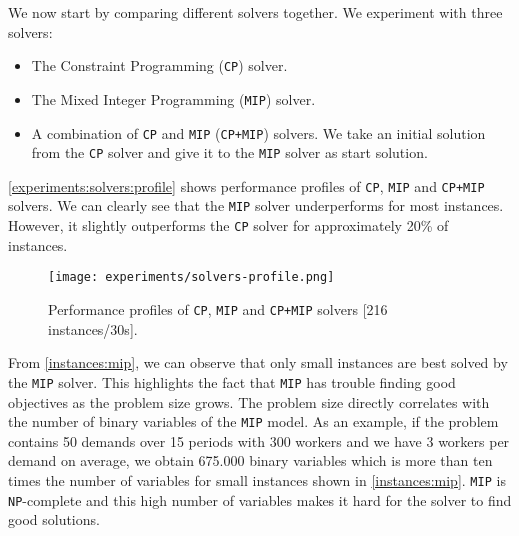 \documentclass[../../thesis.tex]{subfiles}
\begin{document}
We now start by comparing different solvers together. We experiment with three solvers: 

\begin{itemize}
  \item The Constraint Programming (\texttt{CP}) solver.
  \item The Mixed Integer Programming (\texttt{MIP}) solver.
  \item A combination of \texttt{CP} and \texttt{MIP} (\texttt{CP+MIP}) solvers. We take an initial solution from the \texttt{CP} solver 
  and give it to the \texttt{MIP} solver as start solution. 
\end{itemize}



\autoref{experiments:solvers:profile} 
shows performance profiles of \texttt{CP}, \texttt{MIP} and \texttt{CP+MIP} solvers. We can clearly see that 
the \texttt{MIP} solver underperforms for most instances. However, it slightly outperforms the \texttt{CP} solver for approximately
20\% of instances. 

\begin{figure}
  \centering
  \texttt{[image: experiments/solvers-profile.png]}
  \caption{Performance profiles of \texttt{CP}, \texttt{MIP} and \texttt{CP+MIP} solvers [216 instances/30s].}
  \label{experiments:solvers:profile}
\end{figure}

From \autoref{instances:mip}, we can observe that only small instances are best solved by the \texttt{MIP} solver. 
This highlights the fact that \texttt{MIP} has trouble finding good objectives as the problem size grows.
The problem size directly correlates with the number of binary variables of the \texttt{MIP} model. As an example,
if the problem contains 50 demands over 15 periods with 300 workers and we have 3 workers per demand on average,
we obtain 675.000 binary variables which is more than ten times the number of variables for small instances shown 
in \autoref{instances:mip}. \texttt{MIP} is \texttt{NP}-complete and this high number of variables makes it hard for the solver to find good solutions.
\end{document}
